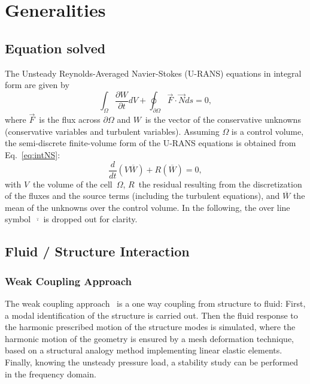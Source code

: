 \chapter{Generalities}
\label{generalities}


\section{Equation solved} %
\label{sec:equation_solved}

The Unsteady Reynolds-Averaged Navier-Stokes (U-RANS) equations in
integral form are given by
\begin{equation}
   \int_\Omega \frac{\partial W}{\partial t} dV + \oint_{\partial
     \Omega} \overrightarrow{F} \cdot \overrightarrow{N} ds = 0,
   \label{eq:intNS}
\end{equation} 
where $\overrightarrow{F}$~is the flux across $\partial \Omega$ and
$W$~is the vector of the conservative unknowns (conservative variables
and turbulent variables).  Assuming $\Omega$ is a
control volume, the semi-discrete finite-volume form of the
U-RANS equations is obtained from Eq.~\eqref{eq:intNS}:
\begin{equation}
   \frac{d}{dt} \left(V  \overline{W}\right) + R \left( \overline{W}
   \right) = 0,
   \label{eq:semiDiscNS}
\end{equation} 
with $V$~the volume of the cell~$\Omega$, $R$~the residual resulting
from the discretization of the fluxes and the source terms (including
the turbulent equations), and $\overline{W}$ the mean of the
unknowns over the control volume.  In the following, the over line
symbol~$\overline{\cdot}$ is dropped out for clarity.

\section{Fluid / Structure Interaction}

\subsection{Weak Coupling Approach}

The weak coupling approach~\cite{Rougeault2003} is a one way
  coupling from structure to fluid: First, a modal identification
of the structure is carried out. Then the fluid response to the
harmonic prescribed motion of the structure modes is simulated,
where the harmonic motion of the geometry is ensured by a mesh
deformation technique, based on a structural analogy method
implementing linear elastic elements. Finally, knowing the unsteady
pressure load, a stability study can be performed in the frequency
domain.

